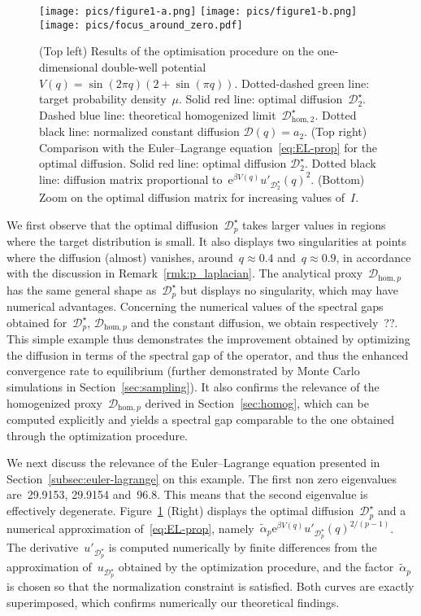\documentclass{article}
\newcommand{\rme}{\mathrm{e}}
\newcommand{\Diff}{\mathcal{D}}
\begin{document}
\begin{figure}
  \centering 
  \texttt{[image: pics/figure1-a.png]}
  \texttt{[image: pics/figure1-b.png]}
  \texttt{[image: pics/focus\_around\_zero.pdf]}
  \caption{\label{fig:res_1} (Top left) Results of the optimisation procedure on the one-dimensional double-well potential~$V(q) =  \sin(2\pi q) (2 + \sin(\pi q))$. Dotted-dashed green line: target probability density~$\mu$. Solid red line: optimal diffusion~$\Diff^{\star}_2$. Dashed blue line: theoretical homogenized limit~$\Diff_{\mathrm{hom},2}^\star$. Dotted black line: normalized constant diffusion $\Diff(q)=a_2$. (Top right) Comparison with the Euler--Lagrange equation~\eqref{eq:EL-prop} for the optimal diffusion. Solid red line: optimal diffusion $\Diff^{\star}_2$. Dotted black line: diffusion matrix proportional to~$\rme^{\beta V(q)} u'_{\Diff^{\star}_2}(q)^2$. (Bottom) Zoom on the optimal diffusion matrix for increasing values of~$I$.}
\end{figure}

We first observe that the optimal diffusion~$\Diff^{\star}_p$ takes larger values in regions where the target distribution is small. It also displays two singularities at points where the diffusion (almost) vanishes, around~$q \approx 0.4$ and~$q \approx 0.9$, in accordance with the discussion in Remark~\ref{rmk:p_laplacian}. The analytical proxy~$\Diff_{\mathrm{hom},p}$ has the same general shape as~$\Diff^{\star}_p$ but displays no singularity, which may have numerical advantages. Concerning the numerical values of the spectral gaps obtained for~$\Diff^{\star}_p$, $\Diff_{\mathrm{hom},p}$ and the constant diffusion, we obtain respectively~??. This simple example thus demonstrates the improvement obtained by optimizing the diffusion in terms of the spectral gap of the operator, and thus the enhanced convergence rate to equilibrium (further demonstrated by Monte Carlo simulations in Section~\ref{sec:sampling}). It also confirms the relevance of the homogenized proxy~$\Diff_{\mathrm{hom},p}$ derived in Section~\ref{sec:homog}, which can be computed explicitly and yields a spectral gap comparable to the one obtained through the optimization procedure.

We next discuss the relevance of the Euler--Lagrange equation presented in Section~\ref{subsec:euler-lagrange} on this example. The first non zero eigenvalues are~29.9153, 29.9154 and~96.8. This means that the second eigenvalue is effectively degenerate. Figure~\ref{fig:res_1} (Right) displays the optimal diffusion~$\Diff^{\star}_p$ and a numerical approximation of~\eqref{eq:EL-prop}, namely~$\widetilde{\alpha}_p \rme^{\beta V(q)} u'_{\Diff^{\star}_p}(q)^{2/(p-1)}$. The derivative~$u'_{\Diff^{\star}_p}$ is computed numerically by finite differences from the approximation of~$u_{\Diff^{\star}_p}$ obtained by the optimization procedure, and the factor~$\widetilde{\alpha}_p$ is chosen so that the normalization constraint is satisfied. Both curves are exactly superimposed, which confirms numerically our theoretical findings.
\end{document}
